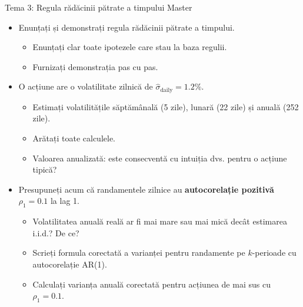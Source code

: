 \documentclass[9pt, aspectratio=169, t]{beamer}
\theoremstyle{definition}
\begin{document}
\begin{frame}{Tema 3: Regula rădăcinii pătrate a timpului \hfill {\small\textcolor{Amber}{Master}}}
\begin{itemize}
    \item Enunțați și demonstrați regula rădăcinii pătrate a timpului.
    \begin{itemize}
        \item Enunțați clar toate ipotezele care stau la baza regulii.
        \item Furnizați demonstrația pas cu pas.
    \end{itemize}
    \item O acțiune are o volatilitate zilnică de $\hat{\sigma}_{\text{daily}} = 1.2\%$.
    \begin{itemize}
        \item Estimați volatilitățile săptămânală (5 zile), lunară (22 zile) și anuală (252 zile).
        \item Arătați toate calculele.
        \item Valoarea anualizată: este consecventă cu intuiția dvs. pentru o acțiune tipică?
    \end{itemize}
    \item Presupuneți acum că randamentele zilnice au \textbf{autocorelație pozitivă} $\rho_1 = 0.1$ la lag 1.
    \begin{itemize}
        \item Volatilitatea anuală reală ar fi mai mare sau mai mică decât estimarea i.i.d.? De ce?
        \item Scrieți formula corectată a varianței pentru randamente pe $k$-perioade cu autocorelație AR(1).
        \item Calculați varianța anuală corectată pentru acțiunea de mai sus cu $\rho_1 = 0.1$.
    \end{itemize}
\end{itemize}
\end{frame}
\end{document}
